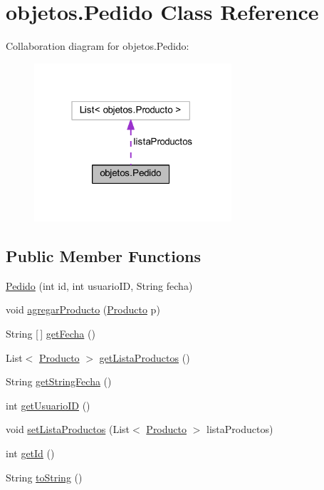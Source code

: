 \hypertarget{classobjetos_1_1_pedido}{}\section{objetos.\+Pedido Class Reference}
\label{classobjetos_1_1_pedido}


Collaboration diagram for objetos.\+Pedido\+:
\nopagebreak
\begin{figure}[H]
\begin{center}
\leavevmode
\includegraphics[width=208pt]{classobjetos_1_1_pedido__coll__graph}
\end{center}
\end{figure}
\subsection*{Public Member Functions}
\begin{DoxyCompactItemize}
\item 
\mbox{\hyperlink{classobjetos_1_1_pedido_a2f4d8a34c054b61efca09e21891dc119}{Pedido}} (int id, int usuario\+ID, String fecha)
\item 
void \mbox{\hyperlink{classobjetos_1_1_pedido_ac1b1b41df8f346ef077017deccf269b5}{agregar\+Producto}} (\mbox{\hyperlink{classobjetos_1_1_producto}{Producto}} p)
\item 
String \mbox{[}$\,$\mbox{]} \mbox{\hyperlink{classobjetos_1_1_pedido_ad9981fc190fd02fbf4f9c44811fc2102}{get\+Fecha}} ()
\item 
List$<$ \mbox{\hyperlink{classobjetos_1_1_producto}{Producto}} $>$ \mbox{\hyperlink{classobjetos_1_1_pedido_a9e4f2c0942939a0defdea21140e85e94}{get\+Lista\+Productos}} ()
\item 
String \mbox{\hyperlink{classobjetos_1_1_pedido_af2c6fe4c929f1fce6443e3ffcb2c0a45}{get\+String\+Fecha}} ()
\item 
int \mbox{\hyperlink{classobjetos_1_1_pedido_afed5e1d427d944ead970861ef07be474}{get\+Usuario\+ID}} ()
\item 
void \mbox{\hyperlink{classobjetos_1_1_pedido_a642984750b50555899811e39208729b4}{set\+Lista\+Productos}} (List$<$ \mbox{\hyperlink{classobjetos_1_1_producto}{Producto}} $>$ lista\+Productos)
\item 
int \mbox{\hyperlink{classobjetos_1_1_pedido_a2cedae9fd179897d4d7e83b655d6fa58}{get\+Id}} ()
\item 
String \mbox{\hyperlink{classobjetos_1_1_pedido_a2db5b46450987a7f2fb289e19cf593ac}{to\+String}} ()
\end{DoxyCompactItemize}


